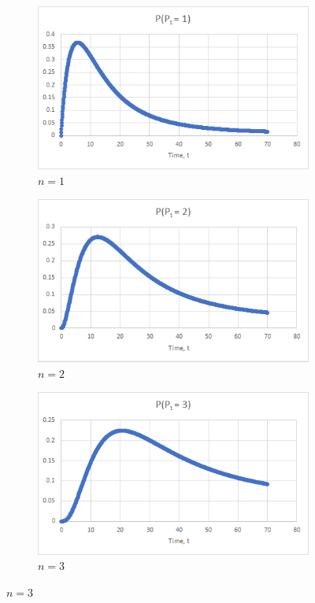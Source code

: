 \documentclass{article}
\begin{document}
\begin{figure}
	\begin{subfigure}{.5\textwidth}
		\centering
		\includegraphics[width=.8\linewidth]{PofPteq1}
		\caption{$n = 1$}
		\label{PofPteq1}
	\end{subfigure}
	\begin{subfigure}{.5\textwidth}
		\centering
		\includegraphics[width=.8\linewidth]{PofPteq2}
		\caption{$n = 2$}
		\label{PofPteq2}
	\end{subfigure}
	\begin{subfigure}{.5\textwidth}
		\centering
		\includegraphics[width=.8\linewidth]{PofPteq3}
		\caption{$n = 3$}
		\label{PofPteq3}
	\end{subfigure}

\end{figure}
\end{document}
